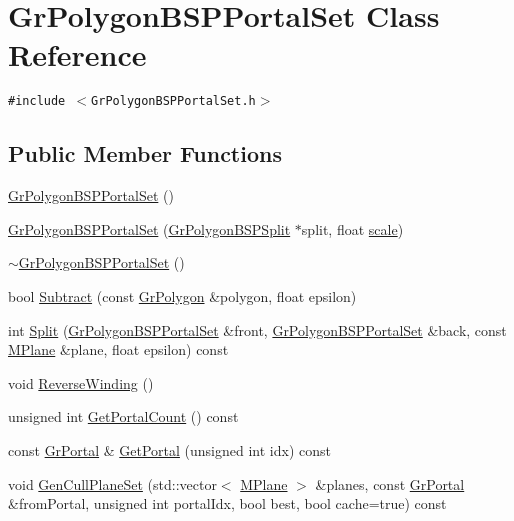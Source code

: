 \hypertarget{class_gr_polygon_b_s_p_portal_set}{
\section{GrPolygonBSPPortalSet Class Reference}
\label{class_gr_polygon_b_s_p_portal_set}
}
{\tt \#include $<$GrPolygonBSPPortalSet.h$>$}

\subsection*{Public Member Functions}
\begin{CompactItemize}
\item 
\hyperlink{class_gr_polygon_b_s_p_portal_set_8c999dbeada3a6fd085881a5cd9a6fac}{GrPolygonBSPPortalSet} ()
\item 
\hyperlink{class_gr_polygon_b_s_p_portal_set_e3a1f400a459229a3e8c77d6480cea86}{GrPolygonBSPPortalSet} (\hyperlink{class_gr_polygon_b_s_p_split}{GrPolygonBSPSplit} $\ast$split, float \hyperlink{glext__bak_8h_281421b881aa7a1266842b73a3bc7655}{scale})
\item 
\hyperlink{class_gr_polygon_b_s_p_portal_set_cf0bf0c229585ce6f1ffd51991c4f2a1}{$\sim$GrPolygonBSPPortalSet} ()
\item 
bool \hyperlink{class_gr_polygon_b_s_p_portal_set_c5d3b95b76f34209537fcbe66e47aa9f}{Subtract} (const \hyperlink{class_gr_polygon}{GrPolygon} \&polygon, float epsilon)
\item 
int \hyperlink{class_gr_polygon_b_s_p_portal_set_9215f97cca8ae51fc89dd82487fc14f2}{Split} (\hyperlink{class_gr_polygon_b_s_p_portal_set}{GrPolygonBSPPortalSet} \&front, \hyperlink{class_gr_polygon_b_s_p_portal_set}{GrPolygonBSPPortalSet} \&back, const \hyperlink{class_m_plane}{MPlane} \&plane, float epsilon) const 
\item 
void \hyperlink{class_gr_polygon_b_s_p_portal_set_c5ed27275dfb126e94fbf1da5a5e787f}{ReverseWinding} ()
\item 
unsigned int \hyperlink{class_gr_polygon_b_s_p_portal_set_d159b8572928f77a50b23264da9a95ac}{GetPortalCount} () const 
\item 
const \hyperlink{class_gr_portal}{GrPortal} \& \hyperlink{class_gr_polygon_b_s_p_portal_set_e771e0ac35b02fd0f7c229121e50e561}{GetPortal} (unsigned int idx) const 
\item 
void \hyperlink{class_gr_polygon_b_s_p_portal_set_d91efd1c01bb37833352a012336cca60}{GenCullPlaneSet} (std::vector$<$ \hyperlink{class_m_plane}{MPlane} $>$ \&planes, const \hyperlink{class_gr_portal}{GrPortal} \&fromPortal, unsigned int portalIdx, bool best, bool cache=true) const 

\end{CompactItemize}
